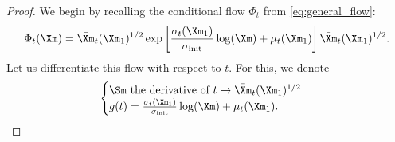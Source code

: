 \documentclass[10pt]{article} %
\theoremstyle{plain}
\theoremstyle{definition}
\theoremstyle{remark}
\begin{document}
\begin{proof}
  We begin by recalling the conditional flow $\Phi_t$ from \cref{eq:general_flow}:
  \begin{equation*}
    \Phi_t(\Xm) = \bar{\Xm}_t(\Xm_1)^{1/2}\exp\left[\frac{\sigma_t(\Xm_1)}{\sigma_{\text{init}}}\log(\Xm) + \mu_t(\Xm_1)\right]\bar{\Xm}_t(\Xm_1)^{1/2}.
  \end{equation*}
  Let us differentiate this flow with respect to $t$. For this, we denote
  \begin{equation*}
    \begin{cases}
      \Sm \text{ the derivative of } t \mapsto \bar{\Xm}_t(\Xm_1)^{1/2} \\
      g(t) = \frac{\sigma_t(\Xm_1)}{\sigma_{\text{init}}}\log(\Xm) + \mu_t(\Xm_1).
    \end{cases}
  \end{equation*}


\end{proof}
\end{document}

